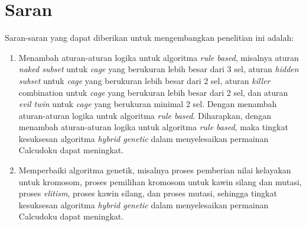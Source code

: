 \section{Saran}
\label{sec:saran}

Saran-saran yang dapat diberikan untuk mengembangkan penelitian ini adalah:

\begin{enumerate}
\item Menambah aturan-aturan logika untuk algoritma \textit{rule based}, misalnya aturan \textit{naked subset} untuk \textit{cage} yang berukuran lebih besar dari 3 sel, aturan \textit{hidden subset} untuk \textit{cage} yang berukuran lebih besar dari 2 sel, aturan \textit{killer} combination untuk \textit{cage} yang berukuran lebih besar dari 2 sel, dan aturan \textit{evil twin} untuk \textit{cage} yang berukuran minimal 2 sel. Dengan menambah aturan-aturan logika untuk algoritma \textit{rule based}. Diharapkan, dengan menambah aturan-aturan logika untuk algoritma \textit{rule based}, maka tingkat kesuksesan algoritma \textit{hybrid genetic} dalam menyelesaikan permainan Calcudoku dapat meningkat.
\item Memperbaiki algoritma genetik, misalnya proses pemberian nilai kelayakan untuk kromosom, proses pemilihan kromosom untuk kawin silang dan mutasi, proses \textit{elitism}, proses kawin silang, dan proses mutasi, sehingga tingkat kesuksesan algoritma \textit{hybrid genetic} dalam menyelesaikan permainan Calcudoku dapat meningkat.
\end{enumerate}